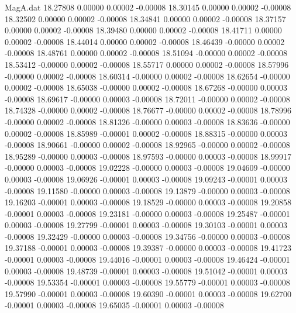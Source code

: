 \begin{filecontents}{MagA.dat}
  18.27808    0.00000    0.00002   -0.00008
  18.30145    0.00000    0.00002   -0.00008
  18.32502    0.00000    0.00002   -0.00008
  18.34841    0.00000    0.00002   -0.00008
  18.37157    0.00000    0.00002   -0.00008
  18.39480    0.00000    0.00002   -0.00008
  18.41711    0.00000    0.00002   -0.00008
  18.44014    0.00000    0.00002   -0.00008
  18.46439   -0.00000    0.00002   -0.00008
  18.48761    0.00000    0.00002   -0.00008
  18.51094   -0.00000    0.00002   -0.00008
  18.53412   -0.00000    0.00002   -0.00008
  18.55717    0.00000    0.00002   -0.00008
  18.57996   -0.00000    0.00002   -0.00008
  18.60314   -0.00000    0.00002   -0.00008
  18.62654   -0.00000    0.00002   -0.00008
  18.65038   -0.00000    0.00002   -0.00008
  18.67268   -0.00000    0.00003   -0.00008
  18.69617   -0.00000    0.00003   -0.00008
  18.72011   -0.00000    0.00002   -0.00008
  18.74328   -0.00000    0.00002   -0.00008
  18.76677   -0.00000    0.00002   -0.00008
  18.78996   -0.00000    0.00002   -0.00008
  18.81326   -0.00000    0.00003   -0.00008
  18.83636   -0.00000    0.00002   -0.00008
  18.85989   -0.00001    0.00002   -0.00008
  18.88315   -0.00000    0.00003   -0.00008
  18.90661   -0.00000    0.00002   -0.00008
  18.92965   -0.00000    0.00002   -0.00008
  18.95289   -0.00000    0.00003   -0.00008
  18.97593   -0.00000    0.00003   -0.00008
  18.99917   -0.00000    0.00003   -0.00008
  19.02228   -0.00000    0.00003   -0.00008
  19.04609   -0.00000    0.00003   -0.00008
  19.06926   -0.00001    0.00003   -0.00008
  19.09243   -0.00001    0.00003   -0.00008
  19.11580   -0.00000    0.00003   -0.00008
  19.13879   -0.00000    0.00003   -0.00008
  19.16203   -0.00001    0.00003   -0.00008
  19.18529   -0.00000    0.00003   -0.00008
  19.20858   -0.00001    0.00003   -0.00008
  19.23181   -0.00000    0.00003   -0.00008
  19.25487   -0.00001    0.00003   -0.00008
  19.27799   -0.00001    0.00003   -0.00008
  19.30103   -0.00001    0.00003   -0.00008
  19.32429   -0.00000    0.00003   -0.00008
  19.34756   -0.00000    0.00003   -0.00008
  19.37188   -0.00001    0.00003   -0.00008
  19.39387   -0.00000    0.00003   -0.00008
  19.41723   -0.00001    0.00003   -0.00008
  19.44016   -0.00001    0.00003   -0.00008
  19.46424   -0.00001    0.00003   -0.00008
  19.48739   -0.00001    0.00003   -0.00008
  19.51042   -0.00001    0.00003   -0.00008
  19.53354   -0.00001    0.00003   -0.00008
  19.55779   -0.00001    0.00003   -0.00008
  19.57990   -0.00001    0.00003   -0.00008
  19.60390   -0.00001    0.00003   -0.00008
  19.62700   -0.00001    0.00003   -0.00008
  19.65035   -0.00001    0.00003   -0.00008

\end{filecontents}
